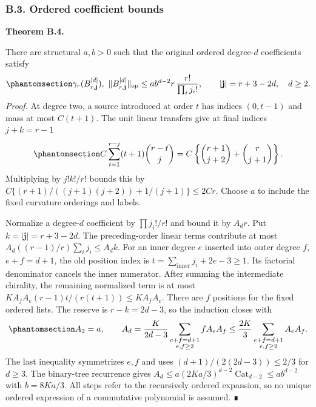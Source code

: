 \documentclass[
  english,
  11pt,
  reqno]{amsart}
\makeatletter
\newcommand{\pandocstatementheading}[1]{%
  \par\addpenalty{\@beginparpenalty}%
  \addvspace{.5\baselineskip plus .2\baselineskip minus .2\baselineskip}%
  {\normalfont\bfseries #1\par}%
  \nobreak\@afterindenttrue\@afterheading
}
\makeatother
\begin{document}
\protect{}\label{sec:gg-budget-coefficients}

\subsubsection{B.3. Ordered coefficient
bounds}\label{b.3.-ordered-coefficient-bounds}

\pandocstatementheading{\protect{}\label{thm:gg-budget-coefficients}Theorem B.4.}

There are structural \(a,b>0\) such that the original ordered
degree-\(d\) coefficients satisfy
\begin{equation}\protect\phantomsection\label{eq:gg-budget-coefficient-conclusion}{
 \gamma_r(B^{[d]}_{r,\mathbf j}),\ 
 \|B^{[d]}_{r,\mathbf j}\|_{\mathrm{op}}
 \le ab^{d-2}r\,\frac{r!}{\prod_i j_i!},
 \qquad |\mathbf j|=r+3-2d,\quad d\ge2 .
}\end{equation} \emph{Proof.} At degree two, a source introduced at
order \(t\) has indices \((0,t-1)\) and mass at most \(C(t+1)\). The
unit linear transfers give at final indices \(j+k=r-1\)
\begin{equation}\protect\phantomsection\label{eq:gg-budget-quadratic-sum}{
 C\sum_{t=1}^{r-j}(t+1)\binom{r-t}{j}
   =C\left\{\binom{r+1}{j+2}+\binom r{j+1}\right\}.
}\end{equation} Multiplying by \(j!k!/r!\) bounds this by
\(C\{(r+1)/((j+1)(j+2))+1/(j+1)\}\le2Cr\). Choose \(a\) to include the
fixed curvature orderings and labels.

Normalize a degree-\(d\) coefficient by \(\prod j_i!/r!\) and bound it
by \(A_dr\). Put \(k=|\mathbf j|=r+3-2d\). The preceding-order linear
terms contribute at most \(A_d((r-1)/r)\sum_i j_i\le A_dk\). For an
inner degree \(e\) inserted into outer degree \(f\), \(e+f=d+1\), the
old position index is \(t=\sum_{\mathrm{inner}}j_i+2e-3\ge1\). Its
factorial denominator cancels the inner numerator. After summing the
intermediate chirality, the remaining normalized term is at most
\(KA_fA_e(r-1)t/(r(t+1))\le KA_fA_e\). There are \(f\) positions for the
fixed ordered lists. The reserve is \(r-k=2d-3\), so the induction
closes with
\begin{equation}\protect\phantomsection\label{eq:gg-budget-degree-recursion}{
 A_2=a,\qquad
 A_d=\frac K{2d-3}\sum_{\substack{e+f=d+1\\e,f\ge2}}fA_eA_f
 \le\frac{2K}{3}\sum_{\substack{e+f=d+1\\e,f\ge2}}A_eA_f .
}\end{equation} The last inequality symmetrizes \(e,f\) and uses
\((d+1)/(2(2d-3))\le2/3\) for \(d\ge3\). The binary-tree recurrence
gives \(A_d\le a(2Ka/3)^{d-2}\operatorname{Cat}_{d-2}
\le ab^{d-2}\) with \(b=8Ka/3\). All steps refer to the recursively
ordered expansion, so no unique ordered expression of a commutative
polynomial is assumed. ∎
\end{document}
